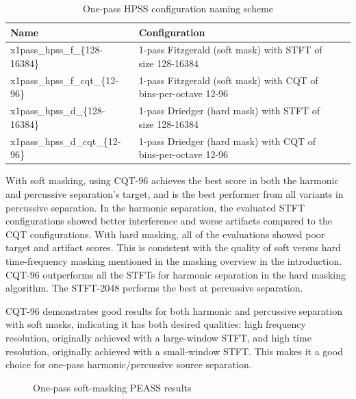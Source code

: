 \documentclass[letter,12pt]{article}
\begin{document}
\begin{table}[ht]
	\centering
\begin{tabular}{ |l|l|c|c| }
	 \hline
	  Name & Configuration \\
	 \hline
	 \hline
	 x1pass\_hpss\_f\_\{128-16384\} & 1-pass Fitzgerald (soft mask) with STFT of size 128-16384 \\
	 \hline
	 x1pass\_hpss\_f\_cqt\_\{12-96\} & 1-pass Fitzgerald (soft mask) with CQT of bins-per-octave 12-96 \\
	 \hline
	 x1pass\_hpss\_d\_\{128-16384\} & 1-pass Driedger (hard mask) with STFT of size 128-16384 \\
	 \hline
	 x1pass\_hpss\_d\_cqt\_\{12-96\} & 1-pass Driedger (hard mask) with CQT of bins-per-octave 12-96 \\
	 \hline
\end{tabular}
	\caption{One-pass HPSS configuration naming scheme}
	\label{table:round1hpss}
\end{table}

With soft masking, using CQT-96 achieves the best score in both the harmonic and percussive separation's target, and is the best performer from all variants in percussive separation. In the harmonic separation, the evaluated STFT configurations showed better interference and worse artifacts compared to the CQT configurations. With hard masking, all of the evaluations showed poor target and artifact scores. This is consistent with the quality of soft versus hard time-frequency masking mentioned in the masking overview \cite{masking} in the introduction. CQT-96 outperforms all the STFTs for harmonic separation in the hard masking algorithm. The STFT-2048 performs the best at percussive separation.

CQT-96 demonstrates good results for both harmonic and percussive separation with soft masks, indicating it has both desired qualities: high frequency resolution, originally achieved with a large-window STFT, and high time resolution, originally achieved with a small-window STFT. This makes it a good choice for one-pass harmonic/percussive source separation.

\begin{figure}[ht]
	\centering
	\caption{One-pass soft-masking PEASS results}
	\label{fig:round1soft}
\end{figure}
\end{document}
